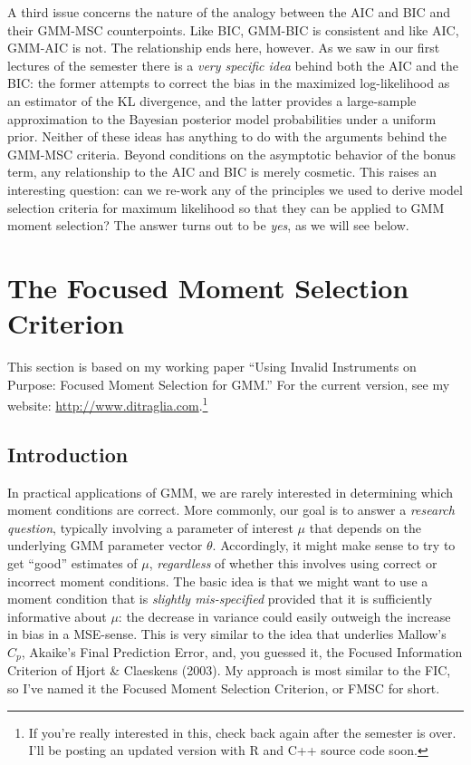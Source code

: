 \documentclass[12pt]{article}
\theoremstyle{definition}
\begin{document}
A third issue concerns the nature of the analogy between the AIC and BIC and their GMM-MSC counterpoints. Like BIC, GMM-BIC is consistent and like AIC, GMM-AIC is not. The relationship ends here, however. As we saw in our first lectures of the semester there is a \emph{very specific idea} behind both the AIC and the BIC: the former attempts to correct the bias in the maximized log-likelihood as an estimator of the KL divergence, and the latter provides a large-sample approximation to the Bayesian posterior model probabilities under a uniform prior. Neither of these ideas has anything to do with the arguments behind the GMM-MSC criteria. Beyond conditions on the asymptotic behavior of the bonus term, any relationship to the AIC and BIC is merely cosmetic. This raises an interesting question: can we re-work any of the principles we used to derive model selection criteria for maximum likelihood so that they can be applied to GMM moment selection? The answer turns out to be \emph{yes}, as we will see below.



\section{The Focused Moment Selection Criterion}
This section is based on my working paper ``Using Invalid Instruments on Purpose: Focused Moment Selection for GMM.'' For the current version, see my website: \url{http://www.ditraglia.com}.\footnote{If you're really interested in this, check back again after the semester is over. I'll be posting an updated version with R and C++ source code soon.}

\subsection{Introduction}
In practical applications of GMM, we are rarely interested in determining which moment conditions are correct. More commonly, our goal is to answer a \emph{research question}, typically involving a parameter of interest $\mu$ that depends on the underlying GMM parameter vector $\theta$. Accordingly, it might make sense to try to get ``good'' estimates of $\mu$, \emph{regardless} of whether this involves using correct or incorrect moment conditions. The basic idea is that we might want to use a moment condition that is \emph{slightly mis-specified} provided that it is sufficiently informative about $\mu$: the decrease in variance could easily outweigh the increase in bias in a MSE-sense. This is very similar to the idea that underlies Mallow's $C_p$, Akaike's Final Prediction Error, and, you guessed it, the Focused Information Criterion of Hjort \& Claeskens (2003). My approach is most similar to the FIC, so I've named it the Focused Moment Selection Criterion, or FMSC for short. 
\end{document}
